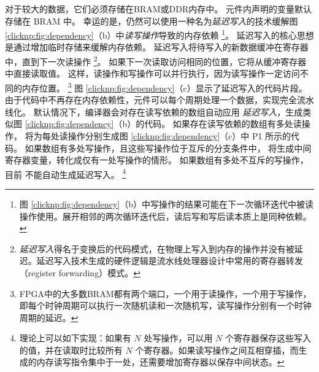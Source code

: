 对于较大的数据，它们必须存储在BRAM或DDR内存中。
元件内声明的变量默认存储在 BRAM 中。
幸运的是，仍然可以使用一种名为\textit {延迟写入}的技术缓解图 \ref {clicknp:fig:dependency}（b）中\textit {读写操作}导致的内存依赖 \footnote{图 \ref {clicknp:fig:dependency}（b）中写操作的结果可能在下一次循环迭代中被读操作使用。展开相邻的两次循环迭代后，读后写和写后读本质上是同种依赖。}。
延迟写入的核心思想是通过增加临时存储来缓解内存依赖。
延迟写入将待写入的新数据缓冲在寄存器中，直到下一次读操作 \footnote{\textit{延迟写入}得名于变换后的代码模式，在物理上写入到内存的操作并没有被延迟。延迟写入技术生成的硬件逻辑是流水线处理器设计中常用的寄存器转发（register forwarding）模式。}。
如果下一次读取访问相同的位置，它将从缓冲寄存器中直接读取值。
这样，读操作和写操作可以并行执行，因为读写操作一定访问不同的内存位置。
\footnote{FPGA中的大多数BRAM都有两个端口，一个用于读操作，一个用于写操作，即每个时钟周期可以执行一次随机读和一次随机写，读写操作分别有一个时钟周期的延迟。}
图 \ref {clicknp:fig:dependency}（c）显示了延迟写入的代码片段。
由于代码中不再存在内存依赖性，元件可以每个周期处理一个数据，实现完全流水线化。
默认情况下，\name 编译器会对存在读写依赖的数组自动应用 \textit {延迟写入}，生成类似图 \ref {clicknp:fig:dependency}（b）的代码。
如果存在读写依赖的数组有多处读操作，\name{} 将为每处读操作分别生成图 \ref {clicknp:fig:dependency}（c）中 P1 所示的代码。
如果数组有多处写操作，且这些写操作位于互斥的分支条件中，\name{} 将生成中间寄存器变量，转化成仅有一处写操作的情形。
如果数组有多处不互斥的写操作，目前 \name{} 不能自动生成延迟写入。
\footnote{理论上可以如下实现：如果有 $N$ 处写操作，可以用 $N$ 个寄存器保存这些写入的值，并在读取时比较所有 $N$ 个寄存器。如果读写操作之间互相穿插，而生成的内存读写指令集中于一处，还需要增加寄存器以保存中间状态。}


